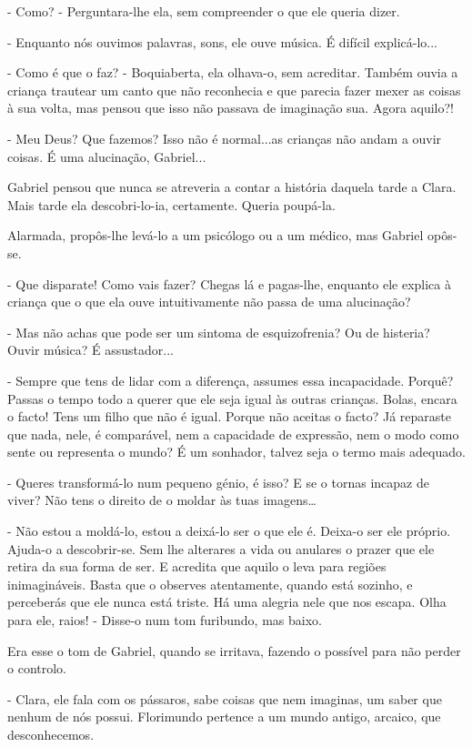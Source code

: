 - Como? - Perguntara-lhe ela, sem compreender o que ele queria dizer.

- Enquanto nós ouvimos palavras, sons, ele ouve música. É difícil
explicá-lo...

- Como é que o faz? - Boquiaberta, ela olhava-o, sem acreditar. Também
ouvia a criança trautear um canto que não reconhecia e que parecia fazer
mexer as coisas à sua volta, mas pensou que isso não passava de
imaginação sua. Agora aquilo?!

- Meu Deus? Que fazemos? Isso não é normal...as crianças não andam a
ouvir coisas. É uma alucinação, Gabriel...

Gabriel pensou que nunca se atreveria a contar a história daquela tarde
a Clara. Mais tarde ela descobri-lo-ia, certamente. Queria poupá-la.

Alarmada, propôs-lhe levá-lo a um psicólogo ou a um médico, mas Gabriel
opôs-se.

- Que disparate! Como vais fazer? Chegas lá e pagas-lhe, enquanto ele
explica à criança que o que ela ouve intuitivamente não passa de uma
alucinação?

- Mas não achas que pode ser um sintoma de esquizofrenia? Ou de
histeria? Ouvir música? É assustador...

- Sempre que tens de lidar com a diferença, assumes essa incapacidade.
Porquê? Passas o tempo todo a querer que ele seja igual às outras
crianças. Bolas, encara o facto! Tens um filho que não é igual. Porque
não aceitas o facto? Já reparaste que nada, nele, é comparável, nem a
capacidade de expressão, nem o modo como sente ou representa o mundo? É
um sonhador, talvez seja o termo mais adequado.

- Queres transformá-lo num pequeno génio, é isso? E se o tornas incapaz
de viver? Não tens o direito de o moldar às tuas imagens\ldots{}

- Não estou a moldá-lo, estou a deixá-lo ser o que ele é. Deixa-o ser
ele próprio. Ajuda-o a descobrir-se. Sem lhe alterares a vida ou
anulares o prazer que ele retira da sua forma de ser. E acredita que
aquilo o leva para regiões inimagináveis. Basta que o observes
atentamente, quando está sozinho, e perceberás que ele nunca está
triste. Há uma alegria nele que nos escapa. Olha para ele, raios! -
Disse-o num tom furibundo, mas baixo.

Era esse o tom de Gabriel, quando se irritava, fazendo o possível para
não perder o controlo.

- Clara, ele fala com os pássaros, sabe coisas que nem imaginas, um
saber que nenhum de nós possui. Florimundo pertence a um mundo antigo,
arcaico, que desconhecemos.

